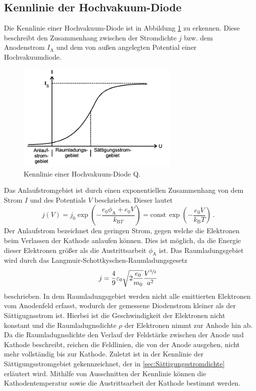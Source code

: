 \subsection{Kennlinie der Hochvakuum-Diode}
Die Kennlinie einer Hochvakuum-Diode ist in Abbildung \ref{fig:Kennlinie} zu erkennen. Diese beschreibt den Zusammenhang zwischen der Stromdichte 
$j$ bzw. dem Anodenstrom $I_{\text{A}}$ und dem von außen angelegten Potential einer Hochvakuumdiode.
\begin{figure}[H]
  \centering
  \includegraphics[width=0.7\textwidth]{content/Bilder/Kennlinie.png}
  \caption{Kennlinie einer Hochvakuum-Diode Q\cite{anleitungV504}.}
  \label{fig:Kennlinie}
\end{figure}
Das Anlaufstromgebiet ist durch einen exponentiellen Zusammenhang von dem Strom $I$ und des Potentials $V$ beschrieben. Dieser lautet
\begin{equation}
    j(V)=j_0 \exp \left( -\frac{e_0 \phi_{\text{A}}+e_0V}{k_{\text{B}T}}\right) = \text{const}\,\exp \left(-\frac{e_0V}{k_{\text{B}}T}\right)\,.
    \label{eqn:Anlaufstrom}
\end{equation}
Der Anlaufstrom bezeichnet den geringen Strom, gegen welche die Elektronen beim Verlassen der Kathode anlaufen können. Dies ist möglich, da die Energie dieser Elektronen
größer als die Austrittsarbeit $\phi_{\text{A}}$ ist. Das Raumladungsgebiet wird durch das Langmuir-Schottkyschen-Raumladungsgesetz 
\begin{equation}
    j = \frac{4}{9}\varepsilon_0 \sqrt{2 \frac{e_0}{m_0}}\frac{V^{\sfrac{3}{2}}}{a^2}
    \label{eqn:Raumladungsgesetz}
\end{equation}
beschrieben. In dem Raumladungsgebiet werden nicht alle emittierten Elektronen vom Anodenfeld erfasst, wodurch der gemessene Diodenstrom kleiner als der Sättigugnsstrom ist. 
Hierbei ist die Geschwindigkeit der Elektronen nicht konstant und die Raumladugnsdichte $\rho$ der Elektronen nimmt zur Anhode hin ab. 
Da die Raumladugnsdichte den Verlauf der Feldstärke zwischen der Anode und Kathode beschreibt, reichen die Feldlinien, die von der Anode ausgehen, nicht mehr vollständig bis zur Kathode.
Zuletzt ist in der Kennlinie der Sättigungsstromgebiet gekennzeichnet, der in \ref{sec:Sättigungsstromdichte} erläutert wird. Mithilfe von Ausschnitten der Kennlinie können die Kathodentemperatur sowie
die Austrittsarbeit der Kathode bestimmt werden. 